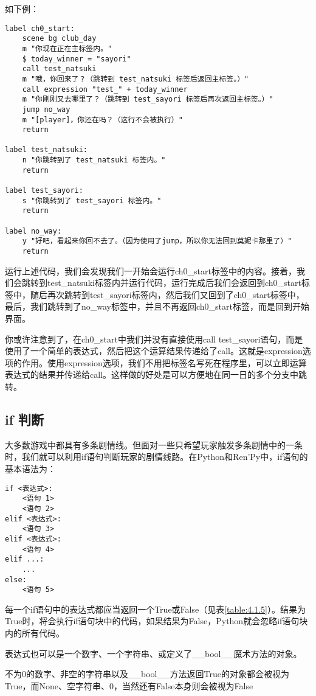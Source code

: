 如下例：
\begin{lstlisting}
label ch0_start:
    scene bg club_day
    m "你现在正在主标签内。"
    $ today_winner = "sayori"
    call test_natsuki
    m "哦，你回来了？（跳转到 test_natsuki 标签后返回主标签。）"
    call expression "test_" + today_winner
    m "你刚刚又去哪里了？（跳转到 test_sayori 标签后再次返回主标签。）"
    jump no_way
    m "[player]，你还在吗？（这行不会被执行）"
    return

label test_natsuki:
    n "你跳转到了 test_natsuki 标签内。"
    return

label test_sayori:
    s "你跳转到了 test_sayori 标签内。"
    return

label no_way:
    y "好吧，看起来你回不去了。（因为使用了jump，所以你无法回到莫妮卡那里了）"
    return
\end{lstlisting}

运行上述代码，我们会发现我们一开始会运行ch0\_start标签中的内容。接着，我们会跳转到test\_natsuki标签内并运行代码，运行完成后我们会返回到ch0\_start标签中，随后再次跳转到test\_sayori标签内，然后我们又回到了ch0\_start标签中，最后，我们跳转到了no\_way标签中，并且不再返回ch0\_start标签，而是回到开始界面。

你或许注意到了，在ch0\_start中我们并没有直接使用call test\_sayori语句，而是使用了一个简单的表达式，然后把这个运算结果传递给了call。这就是expression选项的作用。使用expression选项，我们不用把标签名写死在程序里，可以立即运算表达式的结果并传递给call。这样做的好处是可以方便地在同一日的多个分支中跳转。

\subsection{if 判断}
大多数游戏中都具有多条剧情线。但面对一些只希望玩家触发多条剧情中的一条时，我们就可以利用if语句判断玩家的剧情线路。在Python和Ren'Py中，if语句的基本语法为：
\begin{lstlisting}
if <表达式>:
    <语句 1>
    <语句 2>
elif <表达式>:
    <语句 3>
elif <表达式>:
    <语句 4>
elif ...:
    ...
else:
    <语句 5>
\end{lstlisting}

每一个if语句中的表达式都应当返回一个True或False（见表\ref{table:4.1.5}）。结果为True时，将会执行if语句块中的代码，如果结果为False，Python就会忽略if语句块内的所有代码。

\begin{ExtraKnowledge}
    表达式也可以是一个数字、一个字符串、或定义了\_\_bool\_\_魔术方法的对象。

    不为0的数字、非空的字符串以及\_\_bool\_\_方法返回True的对象都会被视为True，而None、空字符串、0，当然还有False本身则会被视为False
\end{ExtraKnowledge}

